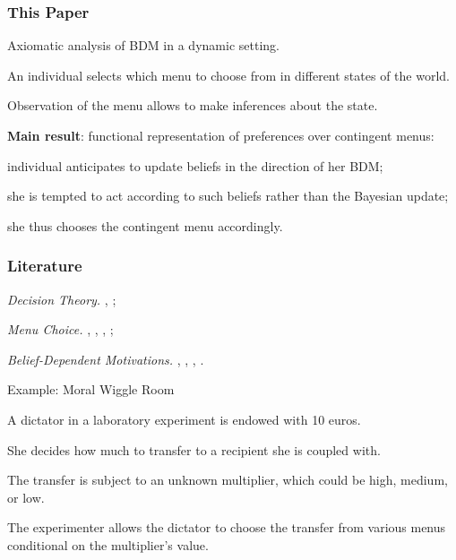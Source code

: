 \documentclass[usenames,dvipsnames,aspectratio=169,11pt, envcountsect, handout]{beamer}
\begin{document}
\begin{frame}\frametitle{This Paper}

	Axiomatic analysis of BDM in a dynamic setting.

	\vfill

	An individual selects which menu to choose from in different states of the world.

	\vfill

	Observation of the menu allows to make inferences about the state.

	\vfill

	\textbf{Main result}: functional representation of preferences over contingent menus:

	\vfill

	\begin{wideitemize}
		\item individual anticipates to update beliefs in the direction of her BDM;
		\item she is tempted to act according to such beliefs rather than the Bayesian update;
		\item she thus chooses the contingent menu accordingly.
	\end{wideitemize}

\end{frame}

\begin{frame}\frametitle{Literature}

	\begin{wideitemize}
		\item \textit{Decision Theory.} \cite{liangInformationdependentExpectedUtility2017}, \cite{dillenbergerAdditivebeliefbasedPreferences2020} \cite{rommeswinkelPreferenceKnowledge2023};
		\item \textit{Menu Choice.} \cite{gulTemptationSelfControl2001}, \cite{ozdenorenCompletingStateSpace2002}, \cite{epsteinAxiomaticModelNonBayesian2006}, \cite{epsteinColdFeet2007};
		\item \textit{Belief-Dependent Motivations.} \cite{eliazCanAnticipatoryFeelings2006}, \cite{benabou2016mindful}, \cite{golmanInformationAvoidance2017}, \cite{battigalliBeliefdependentMotivationsPsychological2022}.
	\end{wideitemize}

\end{frame}

\begin{frame}{Example: Moral Wiggle Room \citep{danaExploitingMoralWiggle2007}}

	A dictator in a laboratory experiment is endowed with 10 euros.

	\vfill

	She decides how much to transfer to a recipient she is coupled with.

	\vfill

	The transfer is subject to an unknown multiplier, which could be high, medium, or low.

	\vfill

	The experimenter allows the dictator to choose the transfer from various menus conditional on the multiplier's value.

\end{frame}
\end{document}
